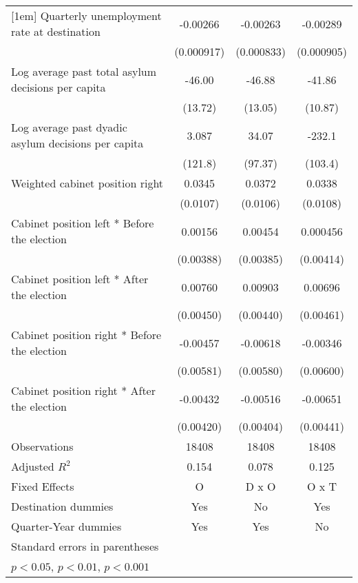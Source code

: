 \begin{table}[htbp]
\begin{tabular}{l*{3}{c}}
[1em]
Quarterly unemployment rate at destination&    -0.00266\sym{**} &    -0.00263\sym{**} &    -0.00289\sym{**} \\
                    &  (0.000917)         &  (0.000833)         &  (0.000905)         \\
[1em]
Log average past total asylum decisions per capita&      -46.00\sym{**} &      -46.88\sym{***}&      -41.86\sym{***}\\
                    &     (13.72)         &     (13.05)         &     (10.87)         \\
[1em]
Log average past dyadic asylum decisions per capita&       3.087         &       34.07         &      -232.1\sym{*}  \\
                    &     (121.8)         &     (97.37)         &     (103.4)         \\
[1em]
Weighted cabinet position right&      0.0345\sym{**} &      0.0372\sym{**} &      0.0338\sym{**} \\
                    &    (0.0107)         &    (0.0106)         &    (0.0108)         \\
[1em]
Cabinet position left * Before the election&     0.00156         &     0.00454         &    0.000456         \\
                    &   (0.00388)         &   (0.00385)         &   (0.00414)         \\
[1em]
Cabinet position left * After the election&     0.00760         &     0.00903\sym{*}  &     0.00696         \\
                    &   (0.00450)         &   (0.00440)         &   (0.00461)         \\
[1em]
Cabinet position right * Before the election&    -0.00457         &    -0.00618         &    -0.00346         \\
                    &   (0.00581)         &   (0.00580)         &   (0.00600)         \\
[1em]
Cabinet position right * After the election&    -0.00432         &    -0.00516         &    -0.00651         \\
                    &   (0.00420)         &   (0.00404)         &   (0.00441)         \\
\hline
Observations        &       18408         &       18408         &       18408         \\
Adjusted \(R^{2}\)  &       0.154         &       0.078         &       0.125         \\
Fixed Effects       &           O         &       D x O         &       O x T         \\
Destination dummies &         Yes         &          No         &         Yes         \\
Quarter-Year dummies&         Yes         &         Yes         &          No         \\
\hline\hline
\multicolumn{4}{l}{\footnotesize Standard errors in parentheses}\\
\multicolumn{4}{l}{\footnotesize \sym{*} \(p<0.05\), \sym{**} \(p<0.01\), \sym{***} \(p<0.001\)}\\
\end{tabular}
\end{table}
